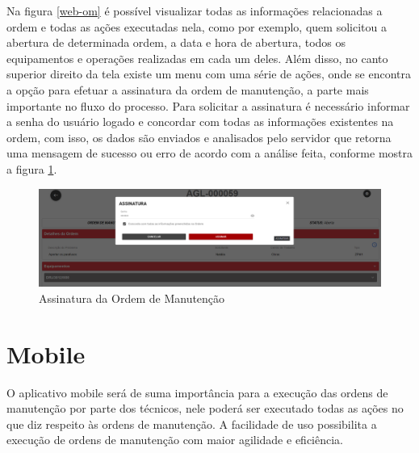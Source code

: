 Na figura \ref{web-om} é possível visualizar todas as informações relacionadas a ordem e todas as ações executadas nela, como por exemplo, quem solicitou a abertura de determinada ordem, a data e hora de abertura, todos os equipamentos e operações realizadas em cada um deles. Além disso, no canto superior direito da tela existe um menu com uma série de ações, onde se encontra a opção para efetuar a assinatura da ordem de manutenção, a parte mais importante no fluxo do processo. Para solicitar a assinatura é necessário informar a senha do usuário logado e concordar com todas as informações existentes na ordem, com isso, os dados são enviados e analisados pelo servidor que retorna uma mensagem de sucesso ou erro de acordo com a análise feita, conforme mostra a figura \ref{web-assinatura}.

\begin{figure}[H]
	\caption{\label{web-assinatura}Assinatura da Ordem de Manutenção}
	\begin{center}
		\includegraphics[scale=0.32]{./Figuras/agil.it/web-assinatura.png}
	\end{center}
\end{figure}

\section{Mobile}
O aplicativo mobile será de suma importância para a execução das ordens de manutenção por parte dos técnicos, nele poderá ser executado todas as ações no que diz respeito às ordens de manutenção. A facilidade de uso possibilita a execução de ordens de manutenção com maior agilidade e eficiência.

